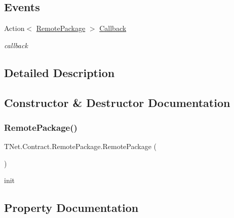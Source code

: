 \subsection*{Events}
\begin{DoxyCompactItemize}
\item 
Action$<$ \mbox{\hyperlink{class_t_net_1_1_contract_1_1_remote_package}{Remote\+Package}} $>$ \mbox{\hyperlink{class_t_net_1_1_contract_1_1_remote_package_ae8be12f234dc53346fc1c90534c3c410}{Callback}}
\begin{DoxyCompactList}\small\item\em callback \end{DoxyCompactList}\end{DoxyCompactItemize}


\subsection{Detailed Description}




\subsection{Constructor \& Destructor Documentation}
\mbox{\label{class_t_net_1_1_contract_1_1_remote_package_ae2994f26f6464ca5cc8197d9fcd7c50a}} 
\subsubsection{\texorpdfstring{Remote\+Package()}{RemotePackage()}}
{\footnotesize\ttfamily T\+Net.\+Contract.\+Remote\+Package.\+Remote\+Package (\begin{DoxyParamCaption}{ }\end{DoxyParamCaption})}



init 



\subsection{Property Documentation}
\mbox{\label{class_t_net_1_1_contract_1_1_remote_package_a356fc18f54113529b4583c3a5d9bd7cc}} 
